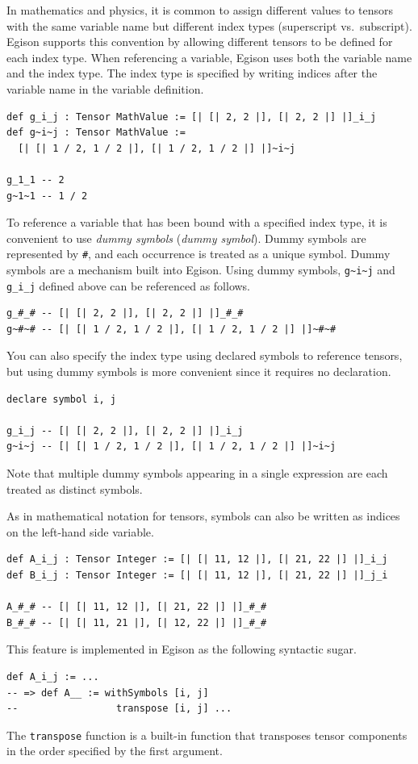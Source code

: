 In mathematics and physics, it is common to assign different values to tensors with the same variable name but different index types (superscript vs.\ subscript).
Egison supports this convention by allowing different tensors to be defined for each index type.
When referencing a variable, Egison uses both the variable name and the index type.
The index type is specified by writing indices after the variable name in the variable definition.
\begin{lstlisting}[language=egison,numbers=none]
def g_i_j : Tensor MathValue := [| [| 2, 2 |], [| 2, 2 |] |]_i_j
def g~i~j : Tensor MathValue :=
  [| [| 1 / 2, 1 / 2 |], [| 1 / 2, 1 / 2 |] |]~i~j

g_1_1 -- 2
g~1~1 -- 1 / 2
\end{lstlisting}

To reference a variable that has been bound with a specified index type, it is convenient to use \emph{dummy symbols} (\emph{dummy symbol}).
Dummy symbols are represented by \lstinline{#}, and each occurrence is treated as a unique symbol.
Dummy symbols are a mechanism built into Egison.
Using dummy symbols, \lstinline{g~i~j} and \lstinline{g_i_j} defined above can be referenced as follows.
\begin{lstlisting}[language=egison,numbers=none]
g_#_# -- [| [| 2, 2 |], [| 2, 2 |] |]_#_#
g~#~# -- [| [| 1 / 2, 1 / 2 |], [| 1 / 2, 1 / 2 |] |]~#~#
\end{lstlisting}
You can also specify the index type using declared symbols to reference tensors, but using dummy symbols is more convenient since it requires no declaration.
\begin{lstlisting}[language=egison,numbers=none]
declare symbol i, j

g_i_j -- [| [| 2, 2 |], [| 2, 2 |] |]_i_j
g~i~j -- [| [| 1 / 2, 1 / 2 |], [| 1 / 2, 1 / 2 |] |]~i~j
\end{lstlisting}
Note that multiple dummy symbols appearing in a single expression are each treated as distinct symbols.

As in mathematical notation for tensors, symbols can also be written as indices on the left-hand side variable.
\begin{lstlisting}[language=egison,numbers=none]
def A_i_j : Tensor Integer := [| [| 11, 12 |], [| 21, 22 |] |]_i_j
def B_i_j : Tensor Integer := [| [| 11, 12 |], [| 21, 22 |] |]_j_i

A_#_# -- [| [| 11, 12 |], [| 21, 22 |] |]_#_#
B_#_# -- [| [| 11, 21 |], [| 12, 22 |] |]_#_#
\end{lstlisting}
This feature is implemented in Egison as the following syntactic sugar.
\begin{lstlisting}[language=egison,numbers=none]
def A_i_j := ...
-- => def A__ := withSymbols [i, j]
--                 transpose [i, j] ...
\end{lstlisting}
The \lstinline{transpose} function is a built-in function that transposes tensor components in the order specified by the first argument.

